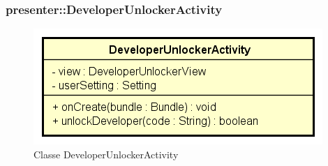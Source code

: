 \documentclass[../DefinizioneDiProdotto.tex]{subfiles}
\begin{document}
\subsubsection{presenter::DeveloperUnlockerActivity}

    \begin{figure}[H]
        \centering
        \includegraphics{img/DeveloperUnlockerActivity.png}
        \caption{Classe DeveloperUnlockerActivity}\label{fig:presenter::DeveloperUnlockerActivity} 
    \end{figure}
\end{document}
